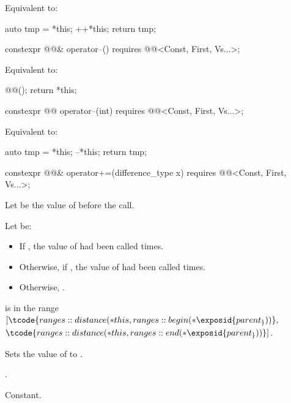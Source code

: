 \begin{itemdescr}
\pnum
\effects
Equivalent to:
\begin{codeblock}
auto tmp = *this;
++*this;
return tmp;
\end{codeblock}
\end{itemdescr}

%
\begin{itemdecl}
constexpr @@& operator--()
  requires @@<Const, First, Vs...>;
\end{itemdecl}

\begin{itemdescr}
\pnum
\effects
Equivalent to:
\begin{codeblock}
@@();
return *this;
\end{codeblock}
\end{itemdescr}

%
\begin{itemdecl}
constexpr @@ operator--(int)
  requires @@<Const, First, Vs...>;
\end{itemdecl}

\begin{itemdescr}
\pnum
\effects
Equivalent to:
\begin{codeblock}
auto tmp = *this;
--*this;
return tmp;
\end{codeblock}
\end{itemdescr}

%
\begin{itemdecl}
constexpr @@& operator+=(difference_type x)
  requires @@<Const, First, Vs...>;
\end{itemdecl}

\begin{itemdescr}
\pnum
Let  be the value of  before the call.

Let  be:
\begin{itemize}
\item
If ,
the value of  had  been called  times.
\item
Otherwise, if ,
the value of  had  been called  times.
\item
Otherwise, .
\end{itemize}

\pnum
\expects
{} is in the range
$[\tcode{ranges::distance(*this, ranges::begin(*\exposid{parent_}))},$\newline
$\tcode{ranges::distance(*this, ranges::end(*\exposid{parent_}))}]$.

\pnum
\effects
Sets the value of  to .

\pnum
\returns
{}.

\pnum
\complexity
Constant.
\end{itemdescr}

